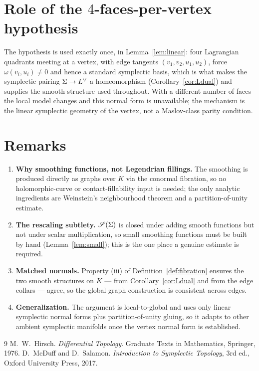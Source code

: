 \documentclass[11pt]{article}
\begin{document}
\section*{Role of the $4$-faces-per-vertex hypothesis}

The hypothesis is used exactly once, in Lemma~\ref{lem:linear}: four Lagrangian
quadrants meeting at a vertex, with edge tangents $(v_1,v_2,u_1,u_2)$, force
$\omega(v_i,u_i)\ne0$ and hence a standard symplectic basis, which is what makes
the symplectic pairing $\Sigma\to L^{\vee}$ a homeomorphism
(Corollary~\ref{cor:Ldual}) and supplies the smooth structure used throughout.
With a different number of faces the local model changes and this normal form is
unavailable; the mechanism is the linear symplectic geometry of the vertex, not a
Maslov-class parity condition.

\section*{Remarks}

\begin{enumerate}\setlength\itemsep{4pt}
\item \textbf{Why smoothing functions, not Legendrian fillings.} The smoothing is
produced directly as graphs over $K$ via the conormal fibration, so no
holomorphic-curve or contact-fillability input is needed; the only analytic
ingredients are Weinstein's neighbourhood theorem and a partition-of-unity
estimate.
\item \textbf{The rescaling subtlety.} $\mathscr S(\Sigma)$ is closed under adding
smooth functions but not under scalar multiplication, so small smoothing
functions must be built by hand (Lemma~\ref{lem:small}); this is the one place a
genuine estimate is required.
\item \textbf{Matched normals.} Property (iii) of Definition~\ref{def:fibration}
ensures the two smooth structures on $K$ — from Corollary~\ref{cor:Ldual} and from
the edge collars — agree, so the global graph construction is consistent across
edges.
\item \textbf{Generalization.} The argument is local-to-global and uses only
linear symplectic normal forms plus partition-of-unity gluing, so it adapts to
other ambient symplectic manifolds once the vertex normal form is established.
\end{enumerate}

\begin{thebibliography}{9}
 M.~W.~Hirsch.
  \emph{Differential Topology}. Graduate Texts in Mathematics, Springer, 1976.
 D.~McDuff and D.~Salamon.
  \emph{Introduction to Symplectic Topology}, 3rd ed.,
  Oxford University Press, 2017.
\end{thebibliography}
\end{document}
